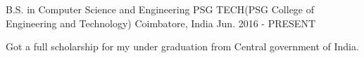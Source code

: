 \begin{cventries}
  \cventry
    {B.S. in Computer Science and Engineering}
    {PSG TECH(PSG College of Engineering and Technology)}
    {Coimbatore, India}
    {Jun. 2016 - PRESENT}
    {
      \begin{cvitems}
        \item {Got a full scholarship for my under graduation from Central government of India.}
      \end{cvitems}
    }
\end{cventries}
